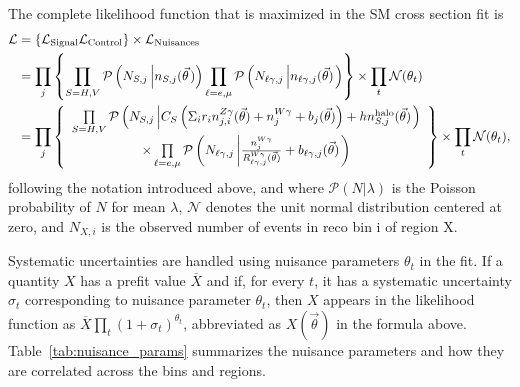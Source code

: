 The complete likelihood function that is maximized in the SM cross section fit is
\begin{align}
  \mathcal{L} & = \left\{ \mathcal{L_{\text{Signal}}} \mathcal{L_{\text{Control}}} \right\} \times \mathcal{L_{\text{Nuisances}}} \\
  & = \prod_{j} \left\{
    \prod_{S=H,V} \mathcal{P}\left( N_{S, j} \left| \nS[,j] (\vec{\theta} \right.) \right) \prod_{\ell=\Pe,\Pmu} \mathcal{P}\left( N_{\ell\Pgamma, j} \left| \nl[,j] (\vec{\theta}) \right. \right) 
    \right\}  \times \prod_{t} \mathcal{N}(\theta_t) \\
  & = \prod_{j} \left\{
  \begin{array}{cc}
    \prod\limits_{S=H,V} \mathcal{P}\left( N_{S, j} \left| C_{S} \left(\Sigma_{i}r_{i}\nZg[j,i](\vec{\theta}) + \nWg[j] + b_{j}(\vec{\theta})\right) + h \nhalo[,j](\vec{\theta}) \right. \right) \\[1.3pt]
    \times \prod\limits_{\ell=\Pe,\Pmu} \mathcal{P}\left( N_{\ell\Pgamma, j} \left| \frac{\nWg[j]}{\RWl[,j](\vec{\theta})} + b_{\ell\Pgamma, j}(\vec{\theta}) \right. \right) \\[1.3pt]
  \end{array} \right\}
  \times \prod_{t} \mathcal{N}(\theta_t),
\end{align}
following the notation introduced above, and where $\mathcal{P}(N\vert\lambda)$ is the Poisson probability of $N$ for mean $\lambda$,
$\mathcal{N}$ denotes the unit normal distribution centered at zero, and $N_{X,i}$ is the observed number of events in reco bin i of region X.

Systematic uncertainties are handled using nuisance parameters $\theta_{t}$ in the fit.
If a quantity $X$ has a prefit value $\overline{X}$ and if, for every $t$, it has a systematic uncertainty $\sigma_{t}$ corresponding to nuisance
parameter $\theta_{t}$, then $X$ appears in the likelihood function as $\overline{X}\prod_{t}(1+\sigma_{t})^{\theta_{t}}$, abbreviated as $X(\vec{\theta})$
in the formula above. Table~\ref{tab:nuisance_params} summarizes the nuisance parameters and how they are correlated across the bins and regions.

